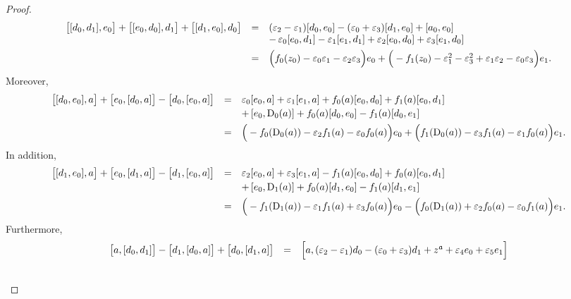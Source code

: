 \documentclass[10pt,a4paper]{amsart}
\newcommand{\D}{\operatorname{D}}
\newcommand{\ai}{\mathfrak{a}}
\begin{document}
\begin{proof}
\begin{equation*}
\begin{array}{r c l}
\big[[d_0,d_1],e_0\big]+\big[[e_0,d_0],d_1\big]+\big[[d_1,e_0],d_0\big]&=&(\varepsilon_2-\varepsilon_1)[d_0,e_0]-(\varepsilon_0+\varepsilon_3)[d_1,e_0]+[a_0,e_0]\\\vspace{1.5mm}
		&&-\,\varepsilon_0[e_0,d_1]-\varepsilon_1[e_1,d_1]+\varepsilon_2[e_0,d_0]+\varepsilon_3[e_1,d_0]\\
		&=&\Big(f_0(z_0)-\varepsilon_0\varepsilon_1-\varepsilon_2\varepsilon_3\Big)e_0+\Big(-f_1(z_0)-\varepsilon_1^2-\varepsilon_3^2+\varepsilon_1\varepsilon_2-\varepsilon_0\varepsilon_3\Big)e_1.
	\end{array}
\end{equation*}
	Moreover,
	\begin{equation*}
		\begin{array}{r c l}\vspace{0.75mm}
\big[[d_0,e_0],a\big]+\big[e_0,[d_0,a]\big]-\big[d_0,[e_0,a]\big]&=&\varepsilon_0[e_0,a]+\varepsilon_1[e_1,a]+f_0(a)[e_0,d_0]+f_1(a)[e_0,d_1]\\\vspace{1.5mm}
		&&+\,[e_0,\D_0(a)]+f_0(a)[d_0,e_0]-f_1(a)[d_0,e_1]\\
		&=&\Big(-f_0(\D_0(a))-\varepsilon_2f_1(a)-\varepsilon_0f_0(a)\Big)e_0+\Big(f_1(\D_0(a))-\varepsilon_3f_1(a)-\varepsilon_1f_0(a)\Big)e_1.
	\end{array}
\end{equation*}
	In addition,
	\begin{equation*}
		\begin{array}{r c l}\vspace{0.75mm}
\big[[d_1,e_0],a\big]+\big[e_0,[d_1,a]\big]-\big[d_1,[e_0,a]\big]&=&\varepsilon_2[e_0,a]+\varepsilon_3[e_1,a]-f_1(a)[e_0,d_0]+f_0(a)[e_0,d_1]\\\vspace{1.5mm}
	&&+\,[e_0,\D_1(a)]+f_0(a)[d_1,e_0]-f_1(a)[d_1,e_1]\\
		&=&\Big(-f_1(\D_1(a))-\varepsilon_1f_1(a)+\varepsilon_3f_0(a)\Big)e_0-\Big(f_0(\D_1(a))+\varepsilon_2f_0(a)-\varepsilon_0f_1(a)\Big)e_1.
	\end{array}
\end{equation*}
	Furthermore,
	\begin{equation*}
		\begin{array}{r c l}\vspace{0.75mm}
\big[a,[d_0,d_1]\big]-\big[d_1,[d_0,a]\big]+\big[d_0,[d_1,a]\big]&=&\Big[a,(\varepsilon_2-\varepsilon_1)d_0-(\varepsilon_0+\varepsilon_3)d_1+z^\ai+\varepsilon_4e_0+\varepsilon_5e_1\Big]\\\vspace{0.75mm}

\end{array}
\end{equation*}
\end{proof}
\end{document}
